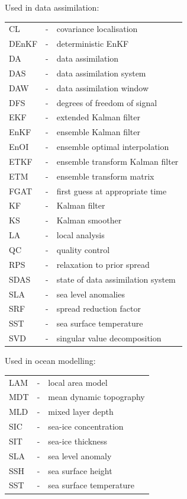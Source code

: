 \documentclass[11pt]{report}
\begin{document}
Used in data assimilation:\\[2mm]
\begin{tabular}{lll}
  CL &-& covariance localisation \\
  DEnKF &-& deterministic EnKF \\
  DA &-& data assimilation \\
  DAS &-& data assimilation system \\
  DAW &-& data assimilation window \\
  DFS &-& degrees of freedom of signal \\
  EKF &-& extended Kalman filter \\
  EnKF &-& ensemble Kalman filter \\
  EnOI &-& ensemble optimal interpolation \\
  ETKF &-& ensemble transform Kalman filter \\
  ETM &-& ensemble transform matrix \\
  FGAT &-& first guess at appropriate time \\
  KF &-& Kalman filter \\
  KS &-& Kalman smoother \\
  LA &-& local analysis \\
  QC &-& quality control \\
  RPS &-& relaxation to prior spread \\
  SDAS &-& state of data assimilation system \\
  SLA &-& sea level anomalies \\
  SRF &-& spread reduction factor \\
  SST &-& sea surface temperature \\
  SVD &-& singular value decomposition \\
\end{tabular}

Used in ocean modelling:\\[2mm]
\begin{tabular}{lll}
  LAM &-& local area model \\
  MDT &-& mean dynamic topography \\
  MLD &-& mixed layer depth \\
  SIC &-& sea-ice concentration \\
  SIT &-& sea-ice thickness \\
  SLA &-& sea level anomaly \\
  SSH &-& sea surface height \\
  SST &-& sea surface temperature\\
\end{tabular}
\end{document}
